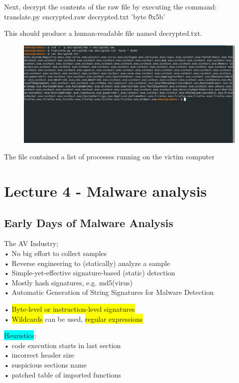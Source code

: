 \documentclass[]{project_plan}
\begin{document}
Next, decrypt the contents of the raw file by executing the command:
translate.py encrypted.raw decrypted.txt 'byte \^ 0x5b'

This should produce a human-readable file named decrypted.txt.

\begin{figure}[H]
  \centering
  \includegraphics[width=\linewidth]{decrypted brb.png}
\end{figure}

The file contained a list of processes running on the victim computer

\chapter{Lecture 4 - Malware analysis}

\section{Early Days of Malware Analysis}
The AV Industry;\\
• No big effort to collect samples\\
• Reverse engineering to (statically) analyze a sample\\
• Simple-yet-effective signature-based (static) detection\\
• Mostly hash signatures, e.g. md5(virus)\\
• Automatic Generation of String Signatures for Malware Detection

• \colorbox{yellow}{Byte-level or instruction-level signatures}\\
• \colorbox{yellow}{Wildcards} can be used, \colorbox{yellow}{regular expressions}

\colorbox{cyan}{Heuristics}:\\
• code execution starts in last section\\
• incorrect header size\\
• suspicious sections name\\
• patched table of imported functions
\end{document}
